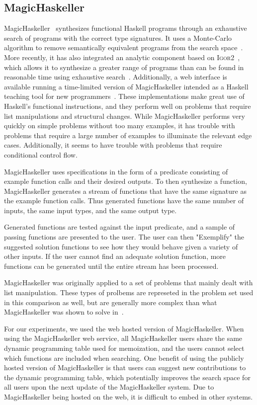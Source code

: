 \subsection{MagicHaskeller}

MagicHaskeller~\cite{katayama2010,Katayama05} synthesizes functional Haskell programs through an exhaustive search of programs with the correct type signatures. It uses a Monte-Carlo algorithm to remove semantically equivalent programs from the search space~\cite{Katayama2008}. More recently, it has also integrated an analytic component based on \textsc{Igor2}~\cite{kitzelmann2011two}, which allows it to synthesize a greater range of programs than can be found in reasonable time using exhaustive search~\cite{katayama2011magichaskeller}. Additionally, a web interface is available running a time-limited version of MagicHaskeller intended as a Haskell teaching tool for new programmers~\cite{katayama2013}. These implementations make great use of Haskell's functional instructions, and they perform well on problems that require list manipulations and structural changes. While MagicHaskeller performs very quickly on simple problems without too many examples, it has trouble with problems that require a large number of examples to illuminate the relevant edge cases. Additionally, it seems to have trouble with problems that require conditional control flow.

MagicHaskeller uses specifications in the form of a predicate consisting of example function calls and their desired outputs. To then synthesize a function, MagicHaskeller generates a stream of functions that have the same signature as the example function calls. Thus generated functions have the same number of inputs, the same input types, and the same output type.

Generated functions are tested against the input predicate, and a sample of passing functions are presented to the user. The user can then "Exemplify" the suggested solution functions to see how they would behave given a variety of other inputs. If the user cannot find an adequate solution function, more functions can be generated until the entire stream has been processed.

MagicHaskeller was originally applied to a set of problems that mainly dealt with list manipulation. These types of prolbems are represeted in the problem set used in this comparison as well, but are generally more complex than what MagicHaskeller was shown to solve in~\cite{katayama2013}.

For our experiments, we used the web hosted version of MagicHaskeller. When using the MagicHaskeller web service, all MagicHaskeller users share the same dynamic programming table used for memoization, and the users cannot select which functions are included when searching. One benefit of using the publicly hosted version of MagicHaskeller is that users can suggest new contributions to the dynamic programming table, which potentially improves the search space for all users upon the next update of the MagicHaskeller system. Due to MagicHaskeller being hosted on the web, it is difficult to embed in other systems.

